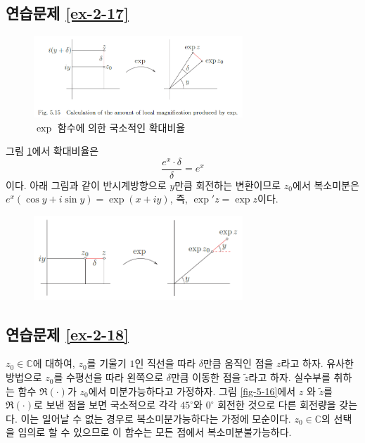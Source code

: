 \subsection*{연습문제 \ref{ex-2-17}}

\begin{figure}[h!]
\begin{center}
\includegraphics[width=0.7\textwidth]{./figs/fig-5-15}
\end{center}
\caption{$\exp$ 함수에 의한 국소적인 확대비율
}
\label{fig-5-15}
\end{figure}

그림 \ref{fig-5-15}에서
확대비율은
\[
\dfrac{e^x\cdot \delta}{\delta} = e^x
\]
이다. 
아래 그림과 같이 반시계방향으로  $y$만큼 회전하는 변환이므로
$z_0$에서 복소미분은 $e^x(\cos y + i\sin y) = \exp(x+iy)$,
즉, $\exp' z = \exp z$이다.

\begin{figure}[h!]
\begin{center}
\includegraphics[width=0.7\textwidth]{./figs/fig-s-0-7}
\end{center}
\end{figure}

\subsection*{연습문제 \ref{ex-2-18}}

$z_0 \in \mathbb C$에 대하여,
$z_0$를 기울기 $1$인 직선을 따라 $\delta$만큼 움직인 점을 $z$라고 하자.
유사한 방법으로 $z_0$를 수평선을 따라 왼쪽으로 $\delta$만큼 이동한 점을 $\tilde z$라고 하자.
실수부를 취하는 함수 $\Re(\cdot)$가 $z_0$에서 미분가능하다고 가정하자.
그림 \ref{fig-5-16}에서 $z$ 와 $\tilde z$를 $\Re(\cdot)$로 보낸 점을 보면 
국소적으로 각각 $45^\circ$와 $0^\circ$ 회전한 것으로 다른 회전량을 갖는다.
이는 일어날 수 없는 경우로 복소미분가능하다는 가정에 모순이다.
$z_0\in \mathbb C$의 선택을 임의로  할 수 있으므로
이 함수는 모든 점에서 복소미분불가능하다.


